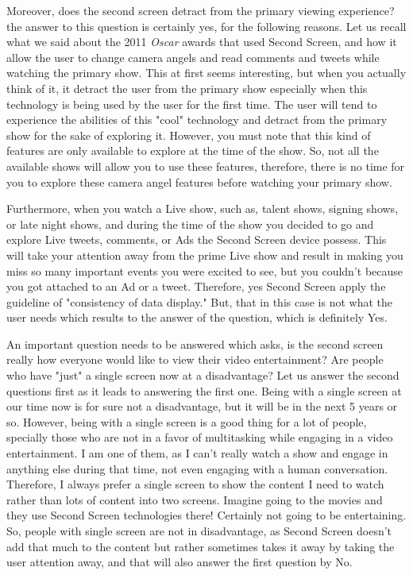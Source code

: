 \documentclass[12pt, oneside]{amsart}   	%
\begin{document}
 Moreover, does the second screen detract from the primary viewing experience?  the answer to this question is certainly yes, for the following reasons.  Let us recall what we said about the 2011 \emph{Oscar} awards that used Second Screen, and how it allow the user to change camera angels and read comments and tweets while watching the primary show.  This at first seems interesting, but when you actually think of it, it detract the user from the primary show especially when this technology is being used  by the user for the first time.  The user will tend to experience the abilities of this "cool" technology and detract from the primary show for the sake of exploring it.  However, you must note that this kind of features are only available to explore at the time of the show.  So, not all the available shows will allow you to use these features, therefore, there is no time for you to explore these camera angel features before watching your primary show. 
 
 Furthermore, when you watch a Live show, such as, talent shows, signing shows, or late night shows, and during the time of the show you decided to go and explore Live tweets, comments, or Ads the Second Screen device possess.  This will take your attention away from the prime Live show and result in making you miss so many important events you were excited to see, but you couldn't because you got attached to an Ad or a tweet\cite{BenifitsAndImpacts}.  Therefore, yes Second Screen apply the guideline of "consistency of data display."  But, that in this case is not what the user needs which results to the answer of the question, which is definitely Yes. 
  
  An important question needs to be answered which asks, is the second screen really how everyone would like to view their video entertainment? Are people who have "just" a single screen now at a disadvantage?  Let us answer the second questions first as it leads to answering the first one.  Being with a single screen at our time now is for sure not a disadvantage, but it will be in the next 5 years or so.  However, being with a single screen is a good thing for a lot of people, specially those who are not in a favor of multitasking while engaging in a video entertainment.  I am one of them, as I can't really watch a show and engage in anything else during that time, not even engaging with a human conversation. Therefore, I always prefer a single screen to show the content I need to watch rather than lots of content into two screens.  Imagine going to the movies and they use Second Screen technologies there! Certainly not going to be entertaining. So, people with single screen are not in disadvantage, as Second Screen doesn't add that much to the content but rather sometimes takes it away by taking the user attention away, and that will also answer the first question by No.
  
\end{document}
